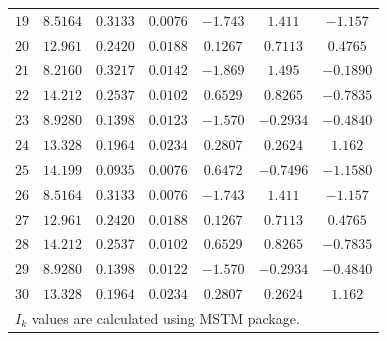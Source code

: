 \documentclass[final, 3p]{elsarticle}
\begin{document}
\begin{table}[h]
\begin{center}
\begin{tabular}{|c|c|c|c|c|c|c|}
			$19$ & $8.5164$ & $0.3133$ & $0.0076$ & $-1.743$ & $1.411$ & $-1.157$ \\
			$20$ & $12.961$ & $0.2420$ & $0.0188$ & $0.1267$ & $0.7113$ & $0.4765$ \\
			$21$ & $8.2160$ & $0.3217$ & $0.0142$ & $-1.869$ & $1.495$ & $-0.1890$ \\
			$22$ & $14.212$ & $0.2537$ & $0.0102$ & $0.6529$ & $0.8265$ & $-0.7835$ \\
			$23$ & $8.9280$ & $0.1398$ & $0.0123$ & $-1.570$ &	$-0.2934$ & $-0.4840$ \\
			$24$ & $13.328$ & $0.1964$ & $0.0234$ & $0.2807$ & $0.2624$ & $1.162$ \\
			$25$ & $14.199$ & $0.0935$ & $0.0076$ & $0.6472$ & $-0.7496$ & $-1.1580$ \\
			$26$ & $8.5164$ & $0.3133$ & $0.0076$ & $-1.743$	& $1.411$ & $-1.157$ \\
			$27$ & $12.961$ & $0.2420$ & $0.0188$ & $0.1267$	& $0.7113$ & $0.4765$ \\
			$28$ & $14.212$ & $0.2537$ & $0.0102$ & $0.6529$ & $0.8265$ & $-0.7835$ \\
			$29$ & $8.9280$ & $0.1398$ & $0.0122$ & $-1.570$ &	$-0.2934$ & $-0.4840$ \\
			$30$ & $13.328$ & $0.1964$ & $0.0234$ & $0.2807$ & $0.2624$ & $1.162$ \\
			\hline\hline
			\multicolumn{7}{l}{\small *$I_k$ values are calculated using MSTM package.}
		\end{tabular}
	\end{center}
\end{table}


\end{document}
